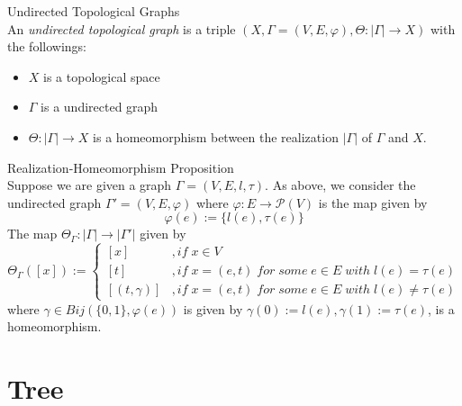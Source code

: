 \begin{definition}{Undirected Topological Graphs}\\
An \textit{undirected topological graph} is a triple $(X, \Gamma= (V,E,\varphi), \Theta: |\Gamma| \to X)$ with the followings:
\begin{itemize}
    \item $X$ is a topological space
    \item $\Gamma$ is a undirected graph
    \item $\Theta : |\Gamma| \to X$ is a homeomorphism between the realization $|\Gamma|$ of $\Gamma$ and $X$.
\end{itemize}
\end{definition}

\begin{proposition}{Realization-Homeomorphism Proposition}\\
Suppose we are given a graph $\Gamma= (V,E,l,\tau)$. As above, we consider the undirected graph $\Gamma' = (V,E,\varphi)$ where $\varphi :E \to \mathcal{P}(V)$ is the map given by
$$\varphi(e) := \{l(e),\tau(e)\}$$
The map $\Theta_\Gamma :|\Gamma| \to |\Gamma'|$ given by
$$\Theta_\Gamma ([x]) := \begin{cases}
    [x] &,if\;x\in V\\
    [t] &,if\; x=(e,t)\;for\;some\;e \in E\;with\; l(e)=\tau(e)\\
    [(t,\gamma)] &,if\; x=(e,t)\;for\;some\;e \in E\;with\; l(e) \neq \tau(e)
\end{cases}$$
where $\gamma \in Bij(\{ 0,1\}, \varphi (e))$ is given by $\gamma(0) :=l(e), \gamma(1):= \tau(e)$, is a homeomorphism.
\end{proposition}

\section{Tree}

